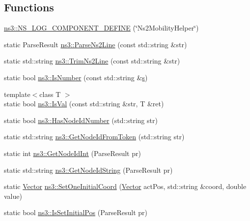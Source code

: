 \subsection*{Functions}
\begin{DoxyCompactItemize}
\item 
\hyperlink{namespacens3_aed34d2eff5ff1c89e102a25d6dec5c2b}{ns3\+::\+N\+S\+\_\+\+L\+O\+G\+\_\+\+C\+O\+M\+P\+O\+N\+E\+N\+T\+\_\+\+D\+E\+F\+I\+NE} (\char`\"{}Ns2\+Mobility\+Helper\char`\"{})
\item 
static Parse\+Result \hyperlink{namespacens3_a675ca86d3b63bf614be1139b5bf1f2b3}{ns3\+::\+Parse\+Ns2\+Line} (const std\+::string \&str)
\item 
static std\+::string \hyperlink{namespacens3_a273fe59c81877ff9ac6aca5277f87b9e}{ns3\+::\+Trim\+Ns2\+Line} (const std\+::string \&str)
\item 
static bool \hyperlink{namespacens3_a1e7c472bb9c018ecd3509390ca7d09b3}{ns3\+::\+Is\+Number} (const std\+::string \&\hyperlink{generate__test__data__lte__sinr_8m_ad83eeb3a142285d1243a08c6b7026df8}{s})
\item 
{\footnotesize template$<$class T $>$ }\\static bool \hyperlink{namespacens3_add0aace81712f0739140817247c21757}{ns3\+::\+Is\+Val} (const std\+::string \&str, T \&ret)
\item 
static bool \hyperlink{namespacens3_ab084126468fe3bcbceb172ac864e2722}{ns3\+::\+Has\+Node\+Id\+Number} (std\+::string str)
\item 
static std\+::string \hyperlink{namespacens3_aabc7928f9303aef852da8fc60fdc6158}{ns3\+::\+Get\+Node\+Id\+From\+Token} (std\+::string str)
\item 
static int \hyperlink{namespacens3_aeb754d89802287943c5dafeb7ba4e1ba}{ns3\+::\+Get\+Node\+Id\+Int} (Parse\+Result pr)
\item 
static std\+::string \hyperlink{namespacens3_af4795da6a0f7062b1e74ceda3414e457}{ns3\+::\+Get\+Node\+Id\+String} (Parse\+Result pr)
\item 
static \hyperlink{classns3_1_1Vector3D_a7e59b47bc94c9cb1dadff68c1d0112d8}{Vector} \hyperlink{namespacens3_a8d6b08fde805f5051072fc60c906255d}{ns3\+::\+Set\+One\+Initial\+Coord} (\hyperlink{classns3_1_1Vector3D_a7e59b47bc94c9cb1dadff68c1d0112d8}{Vector} act\+Pos, std\+::string \&coord, double value)
\item 
static bool \hyperlink{namespacens3_a9857c35eef6abfd7464f64108e1bfd29}{ns3\+::\+Is\+Set\+Initial\+Pos} (Parse\+Result pr)
\item 

\end{DoxyCompactItemize}
